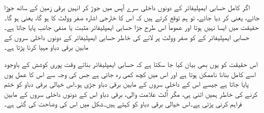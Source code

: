 
اگر کامل حسابی ایمپلیفائر کے دونوں داخلی سرے آپس میں جوڑ کر انہیں برقی زمین کے ساتھ جوڑا جائے، یعنی  کر دیا جائے، تو ہم توقع کرتے ہیں کہ اس کا خارجی   اشارہ صفر وولٹ کا ہو گا، یعنی  ہو گا۔حقیقت میں ایسا نہیں ہوتا اور عموماً اس طرح جڑا حسابی ایمپلیفائر مثبت یا منفی جانب  پایا جاتا ہے۔ حسابی ایمپلیفائر کے  کو صفر وولٹ پر لانے کی خاطر حسابی ایمپلیفائر کے دونوں داخلی سروں کے مابین برقی دباو  مہیا کرنا پڑتا ہے۔

	اس حقیقت کو یوں بھی بیان کیا جا سکتا ہے کہ حسابی ایمپلیفائر بناتے وقت پوری کوشش کے باوجود اسے کامل بنانا ناممکن ہوتا ہے اور اس میں کچھ کمی رہ جاتی ہے جس کی وجہ سے اس کا عمل یوں پایا جاتا ہے جیسے اس کے داخلی سروں کے مابین برقی دباو جڑی ہو۔اس خیالی برقی دباو  کو ختم کرنے کی خاطر ہمیں اتنی ہی، مگر اُلٹ علامت والی، برقی دباو  اس کے دونوں داخلی سروں کے مابین فراہم کرنی پڑتی ہے۔اس خیالی برقی دباو کو   کہتے ہیں۔شکل  میں اس کی وضاحت کی گئی ہے۔

